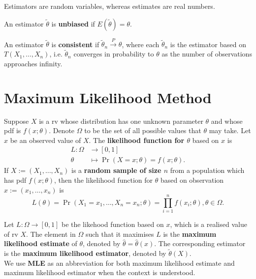 \documentclass[11pt,fleqn]{book} %
\begin{document}
\begin{remark} \label{rmk:514}
Estimators are random variables, whereas estimates are real numbers.
\end{remark}

\begin{definition} \label{def:515}
An estimator \(\tilde{\theta}\) is \textbf{unbiased} if \(E(\tilde{\theta}) = \theta\).
\end{definition}

\begin{definition} \label{def:516}
An estimator \(\tilde{\theta}\) is \textbf{consistent} if \(\tilde{\theta}_n \xrightarrow{P} \theta\), where each \(\tilde{\theta}_n\) is the estimator based on \(T(X_1, \ldots, X_n)\), i.e. \(\tilde{\theta}_n\) converges in probability to \(\theta\) as the number of observations approaches infinity.
\end{definition}


\section{Maximum Likelihood Method}

\begin{definition} \label{def:521}
Suppose \(X\) is a rv whose distribution has one unknown parameter \(\theta\) and whose pdf is \(f(x; \theta)\). Denote \(\Omega\) to be the set of all possible values that \(\theta\) may take. Let \(x\) be an observed value of \(X\). The \textbf{likelihood function for \(\theta\)} based on \(x\) is
\[
\begin{aligned}
L: \Omega &\rightarrow [0, 1] \\
\theta &\mapsto \Pr(X = x; \theta) = f(x; \theta).
\end{aligned}
\]
\indent If \(X := (X_1, \ldots, X_n)\) is a \textbf{random sample of size \(n\)} from a population which has pdf \(f(x; \theta)\), then the likelihood function for \(\theta\) based on observation \(x := (x_1, \ldots, x_n)\) is
\[
L(\theta) = \Pr(X_1 = x_1, \ldots, X_n = x_n; \theta) = \prod_{i=1}^n f(x_i; \theta), \theta \in \Omega.
\]
\end{definition}

\begin{definition} \label{def:522}
Let \(L: \Omega\rightarrow[0, 1]\) be the likehood function based on \(x\), which is a realised value of rv \(X\). The element in \(\Omega\) such that it maximises \(L\) is the \textbf{maximum likelihood estimate} of \(\theta\), denoted by \(\hat{\theta} = \hat{\theta}(x)\). The corresponding estimator is the \textbf{maximum likelihood estimator}, denoted by \(\tilde{\theta}(X)\). \\
\indent We use \textbf{MLE} as an abbreviation for both maximum likelihood estimate and maximum likelihood estimator when the context is understood.
\end{definition}
\end{document}
